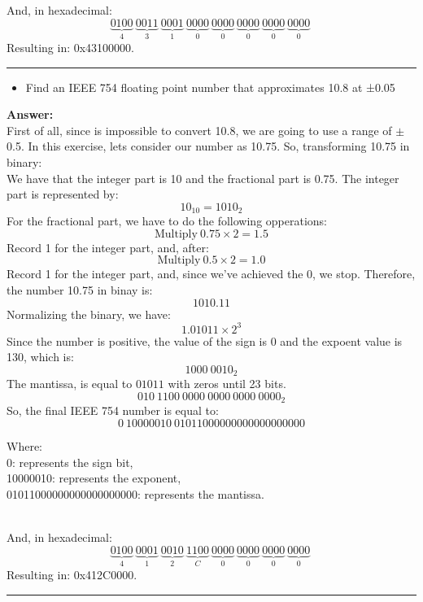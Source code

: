 \documentclass[a4paper,10pt]{article}
\begin{document}
\begin{enumerate}[label=\textbf{Question \arabic*.}]
        And, in hexadecimal:
        \[ \underbrace{0100}_{4}\ \underbrace{0011}_{3}\ \underbrace{0001}_{1}\ \underbrace{0000}_{0}\ \underbrace{0000}_{0}\ \underbrace{0000}_{0}\ \underbrace{0000}_{0}\ \underbrace{0000}_{0}\ \]
        Resulting in: 0x43100000.\\
        \noindent\rule{\textwidth}{0.4mm}

    \begin{itemize}
        \item Find an IEEE 754 floating point number that approximates 10.8 at ±0.05
    \end{itemize}
        \textbf{Answer:} \\
        First of all, since is impossible to convert 10.8, we are going to use a range of $\pm$ 0.5. In this exercise, lets consider our number as 10.75. So, transforming 10.75 in binary: \\
        
        We have that the integer part is 10 and the fractional part is 0.75. The integer part is represented by:
        \[ 10_{10} = 1010_2 \]
        For the fractional part, we have to do the following opperations:
        \[ \text{Multiply}\ 0.75\times2=1.5 \]
        Record 1 for the integer part, and, after:
        \[ \text{Multiply}\ 0.5\times2=1.0 \]
        Record 1 for the integer part, and, since we've achieved the 0, we stop. Therefore, the number 10.75 in binay is:
        \[1010.11\]
        Normalizing the binary, we have:
        \[1.01011\times2^3\]
        Since the number is positive, the value of the sign is 0 and the expoent value is 130, which is:
        \[1000\ 0010_2\]
        The mantissa, is equal to $01011$ with zeros until 23 bits.
        \[010\ 1100\ 0000\ 0000\ 0000\ 0000_2\]
        So, the final IEEE 754 number is equal to:
        \[0\ 10000010\ 01011000000000000000000\]
        \parbox{\textwidth}{
            \small
            Where: \\
            0: represents the sign bit, \\
            10000010: represents the exponent, \\
            01011000000000000000000: represents the mantissa.
        } \\
        And, in hexadecimal:
        \[ \underbrace{0100}_{4}\ \underbrace{0001}_{1}\ \underbrace{0010}_{2}\ \underbrace{1100}_{C}\ \underbrace{0000}_{0}\ \underbrace{0000}_{0}\ \underbrace{0000}_{0}\ \underbrace{0000}_{0}\ \]
        Resulting in: 0x412C0000.\\
        \noindent\rule{\textwidth}{0.4mm}


\end{enumerate}
\end{document}
